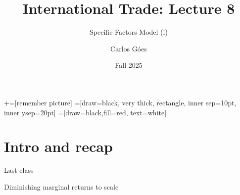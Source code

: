 \documentclass[notes,11pt, aspectratio=169, xcolor=table]{beamer}
\title[]{International Trade: Lecture 8}
\subtitle[]{Specific Factors Model (i)}
\author[Góes]
{Carlos Góes\inst{1}}
\date{Fall 2025}
\institute[GWU]{\inst{1} George Washington University }
\newenvironment{wideitemize}{\itemize\addtolength{\itemsep}{10pt}}{\enditemize}
\begin{document}
\newcommand\marktopleft[1]{%
    \tikz[overlay,remember picture] 
        \node (marker-#1-a) at (-.3em,.3em) {};%
}
\newcommand\markbottomright[2]{%
    \tikz[overlay,remember picture] 
        \node (marker-#1-b) at (0em,0em) {};%
}
+=[remember picture] 
 =[draw=black, very thick, rectangle, inner sep=10pt, inner ysep=20pt]
 =[draw=black,fill=red, text=white]















\frame{\titlepage}
\addtocounter{framenumber}{-1}




\section{Intro and recap}

\begin{frame}{Last class}
\begin{wideitemize}
    \item Diminishing marginal returns to scale
    \item 
\end{wideitemize}
\end{frame}
\end{document}
